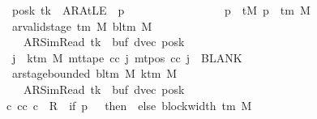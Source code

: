 \begin{isabellebody}
\ \ \ \ \ \ \ \ \ \ \ \ \ posk{\isacharprime}{\kern0pt}\ tk{\isacharprime}{\kern0pt}\ {\isacharequal}{\kern0pt}\ AR{\isacharunderscore}{\kern0pt}AtLE\ {\isasymlongleftrightarrow}\ p{\isacharprime}{\kern0pt}\ {\isacharequal}{\kern0pt}\ {}{\isacharsemicolon}{\kern0pt}\isanewline
\ \ \ \ \ \ \ \ \ \ \ \ \ {}\ {\isasymle}\ p{\isacharprime}{\kern0pt}\ {\isasymLongrightarrow}\ tM{\isacharprime}{\kern0pt}\ p{\isacharprime}{\kern0pt}\ {\isasymin}\ {\isasymGamma}{\isacharunderscore}{\kern0pt}tm\ M{\isacharsemicolon}{\kern0pt}\isanewline
\ \ \ \ \ \ \ \ \ \ \ \ \ ar{\isacharunderscore}{\kern0pt}valid{\isacharunderscore}{\kern0pt}stage\ {\isacharparenleft}{\kern0pt}{\isasymGamma}{\isacharunderscore}{\kern0pt}tm\ M{\isacharparenright}{\kern0pt}\ {\isacharparenleft}{\kern0pt}bl{\isacharunderscore}{\kern0pt}tm\ M{\isacharparenright}{\kern0pt}\isanewline
\ \ \ \ \ \ \ \ \ \ \ \ \ \ \ {\isacharparenleft}{\kern0pt}AR{\isacharunderscore}{\kern0pt}SimRead{\isacharcomma}{\kern0pt}\ tk{\isacharprime}{\kern0pt}{\isacharcomma}{\kern0pt}\ {}{\isacharcomma}{\kern0pt}\ buf{\isacharprime}{\kern0pt}{\isacharcomma}{\kern0pt}\ dvec{\isacharcomma}{\kern0pt}\ posk{\isacharprime}{\kern0pt}{\isacharparenright}{\kern0pt}{\isacharsemicolon}{\kern0pt}\isanewline
\ \ \ \ \ \ \ \ \ \ \ \ \ {\isasymforall}j\ {\isasymge}\ k{\isacharunderscore}{\kern0pt}tm\ M{\isachardot}{\kern0pt}\ mt{\isacharunderscore}{\kern0pt}tape\ cc\ j\ {\isacharparenleft}{\kern0pt}mt{\isacharunderscore}{\kern0pt}pos\ cc\ j{\isacharparenright}{\kern0pt}\ {\isacharequal}{\kern0pt}\ BLANK{}{\isacharsemicolon}{\kern0pt}\isanewline
\ \ \ \ \ \ \ \ \ \ \ \ \ ar{\isacharunderscore}{\kern0pt}stage{\isacharunderscore}{\kern0pt}bounded\ {\isacharparenleft}{\kern0pt}bl{\isacharunderscore}{\kern0pt}tm\ M{\isacharparenright}{\kern0pt}\ {\isacharparenleft}{\kern0pt}k{\isacharunderscore}{\kern0pt}tm\ M{\isacharparenright}{\kern0pt}\isanewline
\ \ \ \ \ \ \ \ \ \ \ \ \ \ \ {\isacharparenleft}{\kern0pt}AR{\isacharunderscore}{\kern0pt}SimRead{\isacharcomma}{\kern0pt}\ tk{\isacharprime}{\kern0pt}{\isacharcomma}{\kern0pt}\ {}{\isacharcomma}{\kern0pt}\ buf{\isacharprime}{\kern0pt}{\isacharcomma}{\kern0pt}\ dvec{\isacharcomma}{\kern0pt}\ posk{\isacharprime}{\kern0pt}{\isacharparenright}{\kern0pt}\ {\isasymrbrakk}\isanewline
\ \ \ \ \ \ \ \ \ \ \ {\isasymLongrightarrow}\ {\isasymexists}c{\isacharprime}{\kern0pt}{\isacharprime}{\kern0pt}{\isachardot}{\kern0pt}\ {\isacharparenleft}{\kern0pt}cc{\isacharcomma}{\kern0pt}\ c{\isacharprime}{\kern0pt}{\isacharprime}{\kern0pt}{\isacharparenright}{\kern0pt}\ {\isasymin}\ R{\isacharprime}{\kern0pt}\ {\isacharcircum}{\kern0pt}{\isacharcircum}{\kern0pt}\ {\isacharparenleft}{\kern0pt}if\ p{\isacharprime}{\kern0pt}\ {\isacharequal}{\kern0pt}\ {}\ then\ {}\ else\ block{\isacharunderscore}{\kern0pt}width\ {\isacharparenleft}{\kern0pt}{\isasymGamma}{\isacharunderscore}{\kern0pt}tm\ M{\isacharparenright}{\kern0pt}\ {\isacharplus}{\kern0pt}\ {}{\isacharparenright}{\kern0pt}\isanewline

\end{isabellebody}
